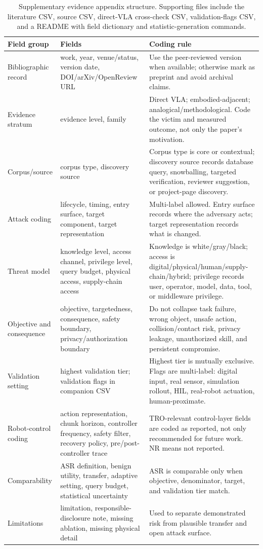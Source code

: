\begin{table}[t]
\centering
\footnotesize
\caption{Supplementary evidence appendix structure. Supporting files include the literature CSV, source CSV, direct-VLA cross-check CSV, validation-flags CSV, and a README with field dictionary and statistic-generation commands.}
\label{tab:database-schema}
\renewcommand{\arraystretch}{1.08}
\setlength{\tabcolsep}{2.5pt}
\begin{tabularx}{\textwidth}{@{}p{}Y p{0.31\textwidth}@{}}
\toprule
\textbf{Field group} & \textbf{Fields} & \textbf{Coding rule} \\
\midrule
Bibliographic record & work, year, venue/status, version date, DOI/arXiv/OpenReview URL & Use the peer-reviewed version when available; otherwise mark as preprint and avoid archival claims. \\
Evidence stratum & evidence level, family & Direct VLA; embodied-adjacent; analogical/methodological. Code the victim and measured outcome, not only the paper's motivation. \\
Corpus/source & corpus type, discovery source & Corpus type is core or contextual; discovery source records database query, snowballing, targeted verification, reviewer suggestion, or project-page discovery. \\
Attack coding & lifecycle, timing, entry surface, target component, target representation & Multi-label allowed. Entry surface records where the adversary acts; target representation records what is changed. \\
Threat model & knowledge level, access channel, privilege level, query budget, physical access, supply-chain access & Knowledge is white/gray/black; access is digital/physical/human/supply-chain/hybrid; privilege records user, operator, model, data, tool, or middleware privilege. \\
Objective and consequence & objective, targetedness, consequence, safety boundary, privacy/authorization boundary & Do not collapse task failure, wrong object, unsafe action, collision/contact risk, privacy leakage, unauthorized skill, and persistent compromise. \\
Validation setting & highest validation tier; validation flags in companion CSV & Highest tier is mutually exclusive. Flags are multi-label: digital input, real sensor, simulation rollout, HIL, real-robot actuation, human-proximate. \\
Robot-control coding & action representation, chunk horizon, controller frequency, safety filter, recovery policy, pre/post-controller trace & TRO-relevant control-layer fields are coded as reported, not only recommended for future work. NR means not reported. \\
Comparability & ASR definition, benign utility, transfer, adaptive setting, query budget, statistical uncertainty & ASR is comparable only when objective, denominator, target, and validation tier match. \\
Limitations & limitation, responsible-disclosure note, missing ablation, missing physical detail & Used to separate demonstrated risk from plausible transfer and open attack surface. \\
\bottomrule
\end{tabularx}
\end{table}
